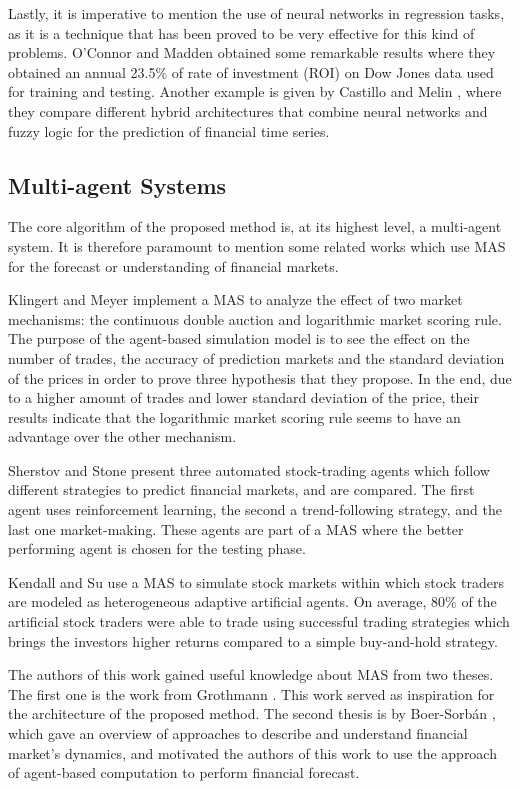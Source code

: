 \documentclass[a4paper,twoside]{article}
\begin{document}
Lastly, it is imperative to mention the use of neural networks in regression tasks, as it is a technique that has been proved to be very effective for this kind of problems. O'Connor and Madden \cite{Connor2005} obtained some remarkable results where they obtained an annual 23.5\% of rate of investment (ROI) on Dow Jones data used for training and testing. Another example is given by Castillo and Melin \cite{castillo2001simulation}, where they compare different hybrid architectures that combine neural networks and fuzzy logic for the prediction of financial time series.

\subsection{Multi-agent Systems}
\label{multi-agent-systems}

The core algorithm of the proposed method is, at its highest level, a multi-agent system. It is therefore paramount to mention some related works which use MAS for the forecast or understanding of financial markets.

Klingert and Meyer \cite{Klingert_2012} implement a MAS to analyze the effect of two market mechanisms: the continuous double auction and logarithmic market scoring rule. The purpose of the agent-based simulation model is to see the effect on the number of trades, the accuracy of prediction markets and the standard deviation of the prices in order to prove three hypothesis that they propose. In the end, due to a higher amount of trades and lower standard deviation of the price, their results indicate that the logarithmic market scoring rule seems to have an advantage over the other mechanism.

Sherstov and Stone \cite{Sherstov2005} present three automated stock-trading agents which follow different strategies to predict financial markets, and are compared. The first agent uses reinforcement learning, the second a trend-following strategy, and the last one market-making. These agents are part of a MAS where the better performing agent is chosen for the testing phase.

Kendall and Su \cite{Kendall2003} use a MAS to simulate stock markets within which stock traders are modeled as heterogeneous adaptive artificial agents. On average, 80\% of the artificial stock traders were able to trade using successful trading strategies which brings the investors higher returns compared to a simple buy-and-hold strategy.

The authors of this work gained useful knowledge about MAS from two theses. The first one is the work from Grothmann \cite{Grothmann2002}. This work served as inspiration for the architecture of the proposed method. The second thesis is by Boer-Sorbán \cite{Boer-Sorban2008}, which gave an overview of approaches to describe and understand financial market's dynamics, and motivated the authors of this work to use the approach of agent-based computation to perform financial forecast.
\end{document}
